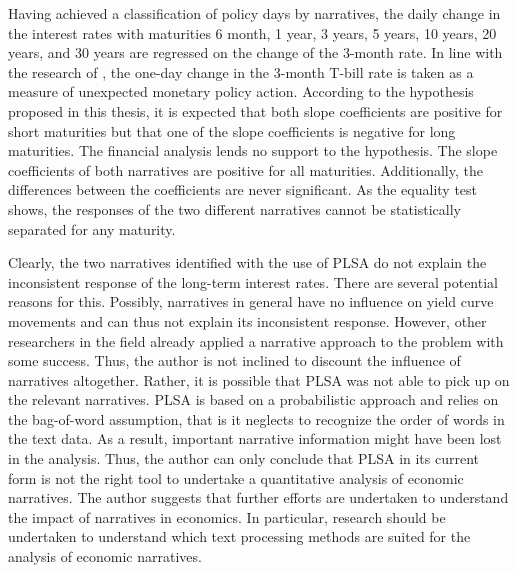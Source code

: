 \documentclass[11pt,a4paper,english,oneside]{book}
\numberwithin{equation}{chapter}
\begin{document}
Having achieved a classification of policy days by narratives, the daily change in the interest rates with maturities 6 month, 1 year, 3 years, 5 years, 10 years, 20 years, and 30 years are regressed on the change of the 3-month rate. In line with the research of \citet{Ellingsen.2003}, the one-day change in the 3-month T-bill rate is taken as a measure of unexpected monetary policy action. According to the hypothesis proposed in this thesis, it is expected that both slope coefficients are positive for short maturities but that one of the slope coefficients is negative for long maturities. The financial analysis lends no support to the hypothesis. The slope coefficients of both narratives are positive for all maturities. Additionally, the differences between the coefficients are never significant. As the equality test shows, the responses of the two different narratives cannot be statistically separated for any maturity.

Clearly, the two narratives identified with the use of PLSA do not explain the inconsistent response of the long-term interest rates. There are several potential reasons for this. Possibly, narratives in general have no influence on yield curve movements and can thus not explain its inconsistent response. However, other researchers in the field already applied a narrative approach to the problem with some success. Thus, the author is not inclined to discount the influence of narratives altogether. Rather, it is possible that PLSA was not able to pick up on the relevant narratives. PLSA is based on a probabilistic approach and relies on the bag-of-word assumption, that is it neglects to recognize the order of words in the text data. As a result, important narrative information might have been lost in the analysis. Thus, the author can only conclude that PLSA in its current form is not the right tool to undertake a quantitative analysis of economic narratives. The author suggests that further efforts are undertaken to understand the impact of narratives in economics. In particular, research should be undertaken to understand which text processing methods are suited for the analysis of economic narratives.  


\newpage

{} 





\newpage

\appendix
\noappendicestocpagenum
\addappheadtotoc
\end{document}

